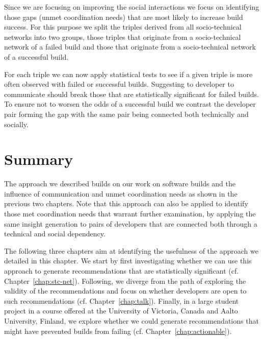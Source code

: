 Since we are focusing on improving the social interactions we focus on identifying those gaps (unmet coordination needs) that are most likely to increase build success.
For this purpose we split the triples derived from all socio-technical networks into two groups, those triples that originate from a socio-technical network of a failed build and those that originate from a socio-technical network of a successful build.

For each triple we can now apply statistical tests to see if a given triple is more often observed with failed or successful builds.
Suggesting to developer to communicate should break those that are statistically significant for failed builds.
To ensure not to worsen the odds of a successful build we contrast the developer pair forming the gap with the same pair being connected both technically and socially.

\section{Summary}
The approach we described builds on our work on software builds and the influence of communication and unmet coordination needs as shown in the previous two chapters.
Note that this approach can also be applied to identify those met coordination needs that warrant further examination, by applying the same insight generation to pairs of developers that are connected both through a technical and social dependency.

The following three chapters aim at identifying the usefulness of the approach we detailed in this chapter.
We start by first investigating whether we can use this approach to generate recommendations that are statistically significant (cf. Chapter~\ref{chap:stc-net}).
Following, we diverge from the path of exploring the validity of the recommendations and focus on whether developers are open to such recommendations (cf. Chapter~\ref{chap:talk}).
Finally, in a large student project in a course offered at the University of Victoria, Canada and Aalto University, Finland, we explore whether we could generate recommendations that might have prevented builds from failing (cf. Chapter~\ref{chap:actionable}).